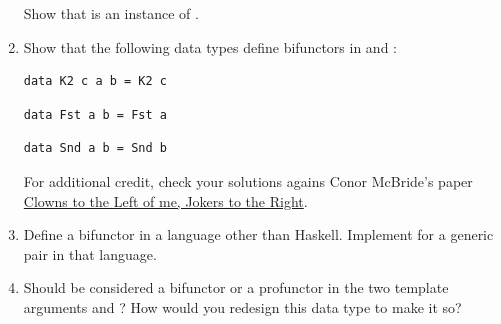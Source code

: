 \begin{enumerate}
  Show that  is an instance of .
\item
  Show that the following data types define bifunctors in  and
  :

\begin{Verbatim}[commandchars=\\\{\}]
data K2 c a b = K2 c
\end{Verbatim}

\begin{Verbatim}[commandchars=\\\{\}]
data Fst a b = Fst a
\end{Verbatim}

\begin{Verbatim}[commandchars=\\\{\}]
data Snd a b = Snd b
\end{Verbatim}

  For additional credit, check your solutions agains Conor McBride's
  paper \href{http://strictlypositive.org/CJ.pdf}{Clowns to the Left of
  me, Jokers to the Right}.
\item
  Define a bifunctor in a language other than Haskell. Implement
   for a generic pair in that language.
\item
  Should  be considered a bifunctor or a profunctor in
  the two template arguments  and ? How would you
  redesign this data type to make it so?
\end{enumerate}